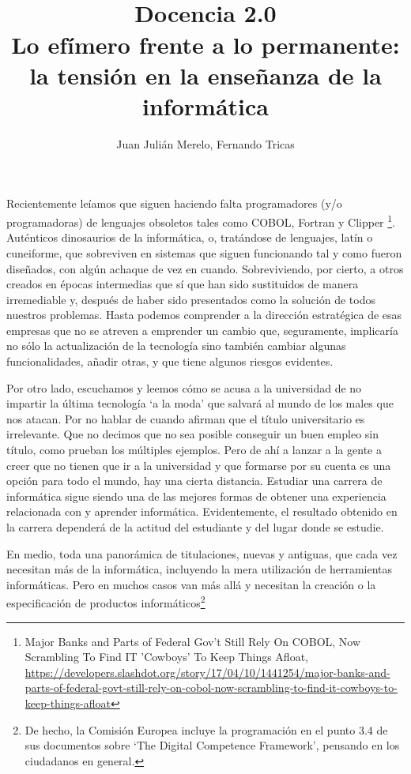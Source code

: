 \documentclass[twoside,10pt]{article}
\title{\ \\ Docencia 2.0\\ \LARGE Lo efímero frente a lo permanente: la tensión en la enseñanza de la informática}
\author{\large Juan Julián Merelo, Fernando Tricas}
\date{}
\begin{document}
\addtocounter{page}{2}

\maketitle
\vspace*{-5ex}

\begin{multicols}{2}

	Recientemente leíamos que siguen haciendo falta programadores
        (y/o programadoras) de lenguajes obsoletos tales como COBOL,
        Fortran y Clipper \footnote{Major Banks and Parts of Federal
          Gov't Still Rely On COBOL, Now Scrambling To Find IT
          'Cowboys' To Keep Things Afloat,  
	  {\tiny
	  \url{https://developers.slashdot.org/story/17/04/10/1441254/major-banks-and-parts-of-federal-govt-still-rely-on-cobol-now-scrambling-to-find-it-cowboys-to-keep-things-afloat}}}. Auténticos
        dinosaurios de la informática, o, tratándose de lenguajes,
        latín o cuneiforme, que sobreviven en sistemas que siguen funcionando tal y como fueron diseñados, con algún achaque de vez en cuando. 
Sobreviviendo, por cierto, a otros creados en épocas intermedias que
sí que han sido sustituidos de manera irremediable y, después de haber
sido presentados como la solución de todos nuestros problemas.
Hasta podemos comprender a la dirección estratégica de esas empresas
que no se atreven a emprender un cambio que, seguramente, implicaría
no sólo la actualización de la tecnología sino también cambiar algunas
funcionalidades, añadir otras, y que tiene algunos riesgos evidentes. 

Por otro lado, escuchamos y leemos cómo se acusa a la universidad de no impartir la última tecnología `a la moda' que salvará al mundo de los males que nos atacan.
Por no hablar de cuando afirman que el título universitario es
irrelevante. Que no decimos que no sea posible conseguir un buen
empleo sin título, como prueban los múltiples ejemplos. Pero de ahí a
lanzar a la gente a creer que no tienen que ir a la universidad y que
formarse por su cuenta es una opción para todo el mundo, hay una
cierta distancia. Estudiar una carrera de informática sigue siendo una
de las mejores formas de obtener una experiencia relacionada con y
aprender informática. Evidentemente, el resultado obtenido en la
carrera dependerá de la actitud del estudiante y del lugar donde se
estudie. 

En medio, toda una panorámica de titulaciones, nuevas y
antiguas, que cada vez necesitan más de la informática, incluyendo la mera
utilización de herramientas informáticas. Pero en muchos casos van más
	allá y necesitan la creación o la especificación de productos informáticos\footnote{De hecho, la Comisión Europea incluye la programación en el punto 3.4 de sus documentos sobre `The Digital Competence Framework', pensando en los ciudadanos en general. 

}
\end{multicols}
\end{document}
